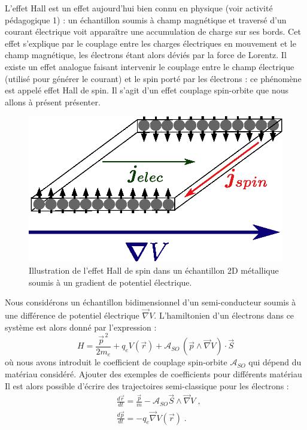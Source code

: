 \documentclass[a4paper,11pt]{article} %
\begin{document}
	L'effet Hall est un effet aujourd'hui bien connu en physique (voir activité pédagogique 1) : un échantillon soumis à champ magnétique et traversé d'un courant électrique voit apparaître une accumulation de charge sur ses bords. Cet effet s'explique par le couplage entre les charges électriques en mouvement et le champ magnétique, les électrons étant alors déviés par la force de Lorentz. Il existe un effet analogue faisant intervenir le couplage entre le champ électrique (utilisé pour générer le courant) et le spin porté par les électrons : ce phénomène est appelé effet Hall de spin. Il s'agit d'un effet couplage spin-orbite que nous allons à présent présenter. 
	
	\begin{figure}[h]
		\centering
		\begin{minipage}[c]{0.85\linewidth}
			\centering
			\includegraphics[width=0.5\linewidth]{./Illustrations/SHE_electrons.eps}
			\caption{Illustration de l'effet Hall de spin dans un échantillon 2D métallique soumis à un gradient de potentiel électrique.}
			\label{fig:spin-Hall-effect}
		\end{minipage}
	\end{figure}
	
	Nous considérons un échantillon bidimensionnel d'un semi-conducteur soumis à une différence de potentiel électrique $\vec{\nabla} V$. L'hamiltonien d'un électrons dans ce système est alors donné par l'expression :
	\begin{equation*}
		\label{exp_hamiltonien_SHE}
		H = \frac{\vec{p}^{\, 2}}{2m_e} + q_e V(\vec{r}) + \mathcal{A}_{SO} \, (\vec{p} \wedge \! \vec{\nabla} V) \cdot \vec{S}
	\end{equation*}
	où nous avons introduit le coefficient de couplage spin-orbite $ \mathcal{A}_{SO} $ qui dépend du matériau considéré. {\color{gray} Ajouter des exemples de coefficients pour différents matériau}\\ %
	
	Il est alors possible d'écrire des trajectoires semi-classique pour les électrons :
	\begin{align}
		& \frac{d\vec{r}}{dt} = \frac{\vec{p}}{m} - \mathcal{A}_{SO} \vec{S} \wedge \vec{\nabla} V \; , \label{eq_mvt_SHE_r} \\
		& \frac{d \vec{p}}{dt} = - q_e \vec{\nabla} V(\vec{r}) \; . \label{eq_mvt_SHE_p}
	\end{align}
\end{document}
